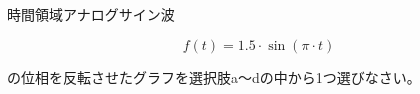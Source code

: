 時間領域アナログサイン波

\[
f(t) = 1.5 \cdot \sin( \pi \cdot t )
\]

\bigskip
\noindent  の位相を反転させたグラフを選択肢a〜dの中から1つ選びなさい。
